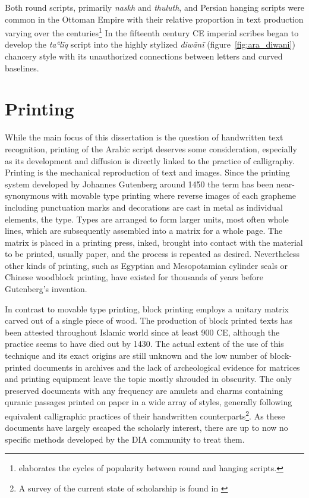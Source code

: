 Both round scripts, primarily \emph{naskh} and \emph{thuluth}, and Persian
hanging scripts were common in the Ottoman Empire with their relative
proportion in text production varying over the centuries\footnote{\cite[chapter
XI]{blair2006islamic} elaborates the cycles of popularity between round and
hanging scripts.} In the fifteenth century CE imperial scribes began to develop
the \emph{taʿlīq} script into the highly stylized \emph{diwānī}
(figure~\ref{fig:ara_diwani}) chancery style with its unauthorized connections
between letters and curved baselines.

\section{Printing}

While the main focus of this dissertation is the question of handwritten text
recognition, printing of the Arabic script deserves some consideration,
especially as its development and diffusion is directly linked to the practice
of calligraphy. Printing is the mechanical reproduction of text and images.
Since the printing system developed by Johannes Gutenberg around 1450 the term
has been near-synonymous with movable type printing where reverse images of
each grapheme including punctuation marks and decorations are cast in metal as
individual elements, the type. Types are arranged to form larger units, most
often whole lines, which are subsequently assembled into a matrix for a whole
page. The matrix is placed in a printing press, inked, brought into contact
with the material to be printed, usually paper, and the process is repeated as
desired. Nevertheless other kinds of printing, such as Egyptian and
Mesopotamian cylinder seals or Chinese woodblock printing, have existed for
thousands of years before Gutenberg's invention. 

In contrast to movable type printing, block printing employs a unitary matrix
carved out of a single piece of wood. The production of block printed texts has
been attested throughout Islamic world since at least 900 CE, although the
practice seems to have died out by 1430. The actual extent of the use of this
technique and its exact origins are still unknown and the low number of
block-printed documents in archives and the lack of archeological evidence for
matrices and printing equipment leave the topic mostly shrouded in obscurity.
The only preserved documents with any frequency are amulets and charms
containing quranic passages printed on paper in a wide array of styles,
generally following equivalent calligraphic practices of their handwritten
counterparts\footnote{A survey of the current state of scholarship is found in
\cite{schaefer2006enigmatic}}. As these documents have largely escaped the
scholarly interest, there are up to now no specific methods developed by the
DIA community to treat them.

